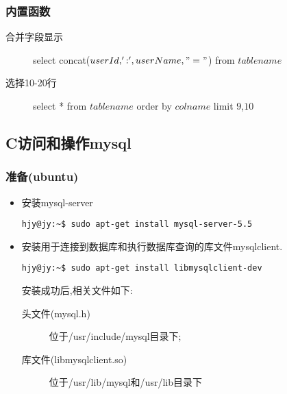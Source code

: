 \subsubsection{内置函数}
\begin{description}
\item[合并字段显示]	select concat($userId,':',userName,"="$) from $tablename$
\item[选择10-20行]	select * from $tablename$ order by $colname$ limit $9$,$10$
\end{description}



\subsection{C访问和操作mysql}
\subsubsection{准备(ubuntu)}
\begin{itemize}
\item 安装mysql-server
\begin{lstlisting}[style=BASH]
hjy@jy:~$ sudo apt-get install mysql-server-5.5
\end{lstlisting}

\item 安装用于连接到数据库和执行数据库查询的库文件mysqlclient.
\begin{lstlisting}[style=BASH]
hjy@jy:~$ sudo apt-get install libmysqlclient-dev
\end{lstlisting}
安装成功后,相关文件如下:
\begin{description}
\item[头文件(mysql.h)] 位于/usr/include/mysql目录下;
\item[库文件(libmysqlclient.so)] 位于/usr/lib/mysql和/usr/lib目录下
\end{description}
\end{itemize}


